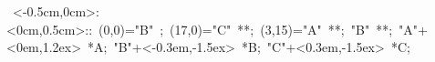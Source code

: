 \hbox{
\xy    <-0.5cm,0cm>:<0cm,0.5cm>::
       (0,0)="B" ; (17,0)="C" **\dir{-}; 
       (3,15)="A" **\dir{-}; "B" **\dir{-};
	 "A"+<0em,1.2ex> *{A};
	 "B"+<-0.3em,-1.5ex> *{B};
	 "C"+<0.3em,-1.5ex> *{C};
       \endxy}
	   
